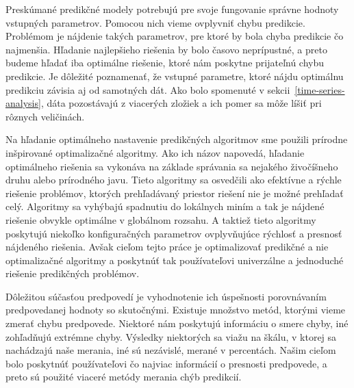 \documentclass[a4paper,slovak,12pt,appendix]{article}
\begin{document}
Preskúmané predikčné modely potrebujú pre svoje fungovanie správne hodnoty vstupných
parametrov. Pomocou nich vieme ovplyvniť chybu predikcie. Problémom je nájdenie
takých parametrov, pre ktoré by bola chyba predikcie čo najmenšia. Hľadanie
najlepšieho riešenia by bolo časovo neprípustné, a preto budeme hľadať iba
optimálne riešenie, ktoré nám poskytne prijateľnú chybu predikcie. Je dôležité
poznamenať, že vstupné parametre, ktoré nájdu optimálnu predikciu závisia aj od
samotných dát. Ako bolo spomenuté v sekcii~\ref{time-series-analysis}, dáta
pozostávajú z viacerých zložiek a ich pomer sa môže líšiť pri rôznych
veličinách.

Na hľadanie optimálneho nastavenie predikčných algoritmov sme použili
prírodne inšpirované optimalizačné algoritmy. Ako ich názov napovedá, hľadanie
optimálneho riešenia sa vykonáva na základe správania sa nejakého živočíšneho
druhu alebo prírodného javu. Tieto algoritmy sa osvedčili ako efektívne a
rýchle riešenie problémov, ktorých prehľadávaný priestor riešení nie je možné
prehľadať celý. Algoritmy sa vyhýbajú spadnutiu do lokálnych miním a tak je
nájdené riešenie obvykle optimálne v globálnom rozsahu. A taktiež tieto algoritmy
poskytujú niekoľko konfiguračných parametrov ovplyvňujúce rýchlosť a presnosť
nájdeného riešenia. Avšak cieľom tejto práce je optimalizovať predikčné
a nie optimalizačné algoritmy a poskytnúť tak používateľovi univerzálne
a jednoduché riešenie predikčných problémov.

Dôležitou súčasťou predpovedí je vyhodnotenie ich úspešnosti porovnávaním
predpovedanej hodnoty so skutočnými. Existuje množstvo
metód, ktorými vieme zmerať chybu predpovede. Niektoré nám poskytujú informáciu
o smere chyby, iné zohľadňujú extrémne chyby. Výsledky niektorých sa viažu na
škálu, v ktorej sa nachádzajú naše merania, iné sú nezávislé, merané v
percentách. Našim cieľom bolo poskytnúť používateľovi čo najviac informácií
o presnosti predpovede, a preto sú použité viaceré metódy merania chýb
predikcií.


\newpage
\end{document}
